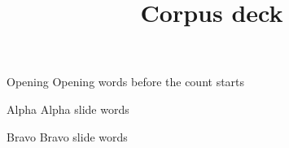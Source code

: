 \documentclass{beamer}
\title{Corpus deck}
\begin{document}
\begin{frame}[noframenumbering]{Opening}
  Opening words before the count starts
\end{frame}
\begin{frame}{Alpha}
  Alpha slide words
\end{frame}
\begin{frame}{Bravo}
  Bravo slide words
\end{frame}
\end{document}
